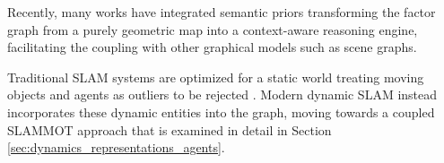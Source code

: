 Recently, many works \cite{bescos_dynaslam_2021} \cite{giberna_dynemo-slam_2025} \cite{brink_using_2016} \cite{deeb_model-based_2019} have integrated semantic priors transforming the factor graph from a purely geometric map into a context-aware reasoning engine, facilitating the coupling with other graphical models such as scene graphs.  

Traditional SLAM systems are optimized for a static world treating moving objects and agents as outliers to be rejected \cite{bescos_dynaslam_2018} \cite{bavle_s-graphs_2025}. 
Modern dynamic SLAM instead incorporates these dynamic entities into the graph, moving towards a coupled SLAMMOT approach that is examined in detail in Section \ref{sec:dynamics_representations_agents}.

